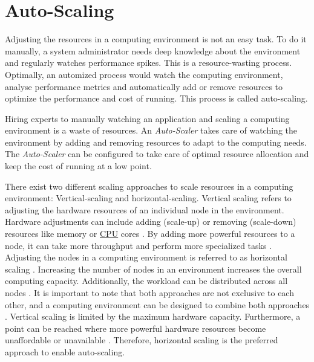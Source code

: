 \section{Auto-Scaling}
Adjusting the resources in a computing environment is not an easy task. To do it manually, a system administrator needs deep knowledge about the environment and regularly watches performance spikes. This is a resource-wasting process. Optimally, an automized process would watch the computing environment, analyse performance metrics and automatically add or remove resources to optimize the performance and cost of running. This process is called auto-scaling.


Hiring experts to manually watching an application and scaling a computing environment is a waste of resources.
An \textit{Auto-Scaler} takes care of watching the environment by adding and removing resources to adapt to the computing needs. The \textit{Auto-Scaler} can be configured to take care of optimal resource allocation and keep the cost of running at a low point.


There exist two different scaling approaches to scale resources in a computing environment: Vertical-scaling and horizontal-scaling.
Vertical scaling refers to adjusting the hardware resources of an individual node in the environment. Hardware adjustments can include adding (scale-up) or removing (scale-down) resources like memory or \hyperlink{abbr:cpu}{CPU} cores \cite{Wilder2012CloudPatterns}. By adding more powerful resources to a node, it can take more throughput and perform more specialized tasks \cite{Abbott2015ScalabilityArt}.
Adjusting the nodes in a computing environment is referred to as horizontal scaling \cite{Wilder2012CloudPatterns}. Increasing the number of nodes in an environment increases the overall computing capacity. Additionally, the workload can be distributed across all nodes \cite{Wilder2012CloudPatterns, Abbott2015ScalabilityArt}.
It is important to note that both approaches are not exclusive to each other, and a computing environment can be designed to combine both approaches \cite{Wilder2012CloudPatterns}.
Vertical scaling is limited by the maximum hardware capacity. Furthermore, a point can be reached where more powerful hardware resources become unaffordable or unavailable \cite{Abbot2011ScalabilityRules}.  Therefore, horizontal scaling is the preferred approach to enable auto-scaling.


